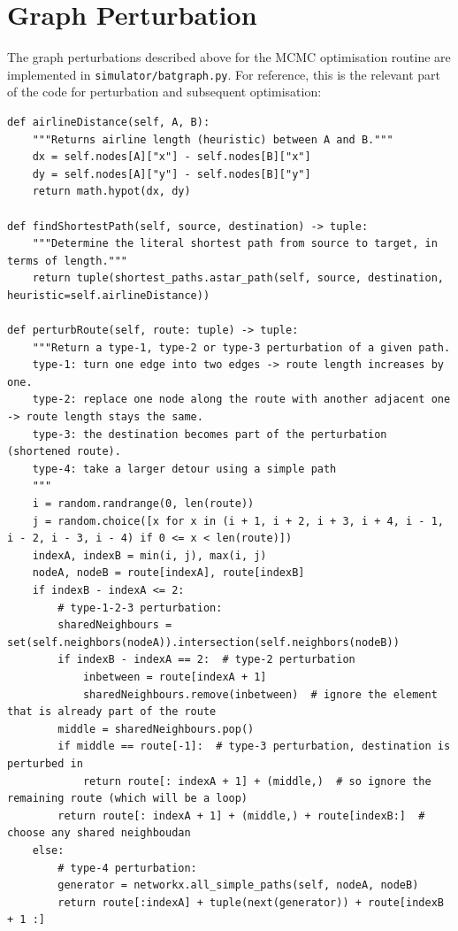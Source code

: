 \documentclass{prettytex/ox/mmsc-special-topic}
\begin{document}
  \section{Graph Perturbation}
  The graph perturbations described above for the MCMC optimisation routine are implemented in \texttt{simulator/batgraph.py}. For reference, this is the relevant part of the code for perturbation and subsequent optimisation:

  \begin{verbatim}
def airlineDistance(self, A, B):
    """Returns airline length (heuristic) between A and B."""
    dx = self.nodes[A]["x"] - self.nodes[B]["x"]
    dy = self.nodes[A]["y"] - self.nodes[B]["y"]
    return math.hypot(dx, dy)

def findShortestPath(self, source, destination) -> tuple:
    """Determine the literal shortest path from source to target, in terms of length."""
    return tuple(shortest_paths.astar_path(self, source, destination, heuristic=self.airlineDistance))

def perturbRoute(self, route: tuple) -> tuple:
    """Return a type-1, type-2 or type-3 perturbation of a given path.
    type-1: turn one edge into two edges -> route length increases by one.
    type-2: replace one node along the route with another adjacent one -> route length stays the same.
    type-3: the destination becomes part of the perturbation (shortened route).
    type-4: take a larger detour using a simple path
    """
    i = random.randrange(0, len(route))
    j = random.choice([x for x in (i + 1, i + 2, i + 3, i + 4, i - 1, i - 2, i - 3, i - 4) if 0 <= x < len(route)])
    indexA, indexB = min(i, j), max(i, j)
    nodeA, nodeB = route[indexA], route[indexB]
    if indexB - indexA <= 2:
        # type-1-2-3 perturbation:
        sharedNeighbours = set(self.neighbors(nodeA)).intersection(self.neighbors(nodeB))
        if indexB - indexA == 2:  # type-2 perturbation
            inbetween = route[indexA + 1]
            sharedNeighbours.remove(inbetween)  # ignore the element that is already part of the route
        middle = sharedNeighbours.pop()
        if middle == route[-1]:  # type-3 perturbation, destination is perturbed in
            return route[: indexA + 1] + (middle,)  # so ignore the remaining route (which will be a loop)
        return route[: indexA + 1] + (middle,) + route[indexB:]  # choose any shared neighboudan
    else:
        # type-4 perturbation:
        generator = networkx.all_simple_paths(self, nodeA, nodeB)
        return route[:indexA] + tuple(next(generator)) + route[indexB + 1 :]
  \end{verbatim}

  \printnoidxglossary[type=acronym, title={Acronyms}]
\end{document}
